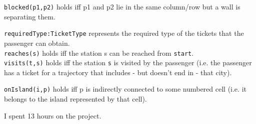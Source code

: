 

\texttt{blocked(p1,p2)} holds iff p1 and p2 lie in the same column/row but a wall is separating them.


\texttt{requiredType:TicketType} represents the required type of the tickets that the passenger can obtain.\\
\texttt{reaches(s)} holds iff the station s can be reached from \texttt{start}.\\
\texttt{visits(t,s)} holds iff the station \texttt{s} is visited by the passenger (i.e. the passenger has a ticket for a trajectory that includes - but doesn't end in - that city).


\texttt{onIsland(i,p)} holds iff p is indirectly connected to some numbered cell (i.e. it belongs to the island represented by that cell).


I spent 13 hours on the project.